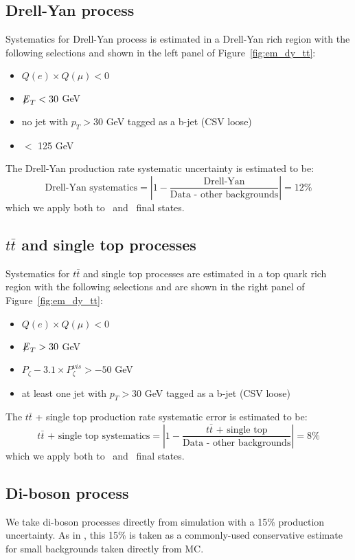 \subsection{Drell-Yan process}\label{sec:em_DY}
Systematics for Drell-Yan process is estimated in a Drell-Yan rich 
region with the following selections and shown in the left panel of 
Figure~\ref{fig:em_dy_tt}:
\begin{itemize}
  \item $Q(e) \times Q(\mu) < 0$
  \item ${\not\mathrel{E}}_T<30$ GeV
  \item no jet with $p_T>30$ GeV tagged as a b-jet (CSV loose)
  \item \meffemu $<$ 125 GeV
\end{itemize}
The Drell-Yan production rate systematic uncertainty is estimated to
be:
\begin{equation}\label{eq:DY}
\text{Drell-Yan systematics} = \left| 1 - \frac{\text{Drell-Yan}}{\text{Data - other backgrounds}}\right| = 12\%
\end{equation}
which we apply both to \tetm ~and \teth ~final states.

\subsection{$t\bar{t}$ and single top processes}\label{sec:em_tt}
Systematics for $t\bar{t}$ and single top processes are estimated in a
top quark rich region with the following selections and are shown in the
right panel of Figure~\ref{fig:em_dy_tt}:
\begin{itemize}
  \item $Q(e) \times Q(\mu) < 0$
  \item ${\not\mathrel{E}}_T>30$ GeV
  \item $P_{\zeta}- 3.1 \times P_{\zeta}^{vis} > -50$ GeV
  \item at least one jet with $p_T>30$ GeV tagged as a b-jet (CSV loose)
\end{itemize}
The $t\bar{t}$ + single top production rate systematic error is estimated to be:
\begin{equation}\label{eq:em_tt}
\text{$t\bar{t}$ + single top systematics} = \left| 1 - \frac{\text{$t\bar{t}$ + single top}}{\text{Data - other backgrounds}}\right| = 8\%
\end{equation}
which we apply both to \tetm ~and \teth ~final states.

\subsection{Di-boson process}
We take di-boson processes directly from simulation with a 15\% production uncertainty. As in \teth , this 15\% is taken as a commonly-used conservative estimate for small backgrounds taken directly from MC.


